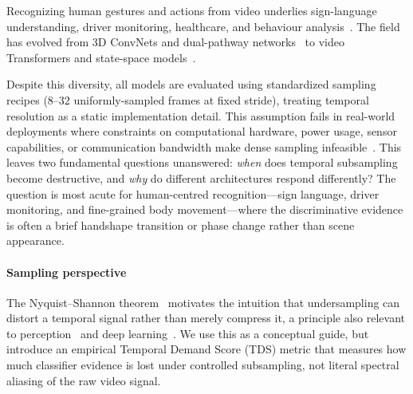 \documentclass[a4paper, 10pt, conference]{ieeeconf}
\newcommand{\TDS}{\textsc{TDS}}
\begin{document}
Recognizing human gestures and actions from video underlies sign-language understanding, driver monitoring, healthcare, and behaviour analysis~\cite{5771372,10484402}. The field has evolved from 3D ConvNets and dual-pathway networks~\cite{tran2015c3d,carreira2017i3d,tran2018r2plus1d,wang2018nonlocal,feichtenhofer2019slowfast} to video Transformers and state-space models~\cite{bertasius2021timesformer,arnab2021vivit,liu2022videoswin,fan2021mvit,tong2022videomae,wang2023videomaev2,li2024videomamba}.

Despite this diversity, all models are evaluated using standardized sampling recipes (8--32 uniformly-sampled frames at fixed stride), treating temporal resolution as a static implementation detail. This assumption fails in real-world deployments where constraints on computational hardware, power usage, sensor capabilities, or communication bandwidth make dense sampling infeasible~\cite{lin2019tsm}. This leaves two fundamental questions unanswered: \emph{when} does temporal subsampling become destructive, and \emph{why} do different architectures respond differently? The question is most acute for human-centred recognition---sign language, driver monitoring, and fine-grained body movement---where the discriminative evidence is often a brief handshape transition or phase change rather than scene appearance.

\paragraph{Sampling perspective}
The Nyquist--Shannon theorem~\cite{shannon1949communication} motivates the intuition that undersampling can distort a temporal signal rather than merely compress it, a principle also relevant to perception~\cite{vanrullen2007wagon} and deep learning~\cite{zhang2019antialiased}. We use this as a conceptual guide, but introduce an empirical Temporal Demand Score (\TDS{}) metric that measures how much classifier evidence is lost under controlled subsampling, not literal spectral aliasing of the raw video signal.
\end{document}
